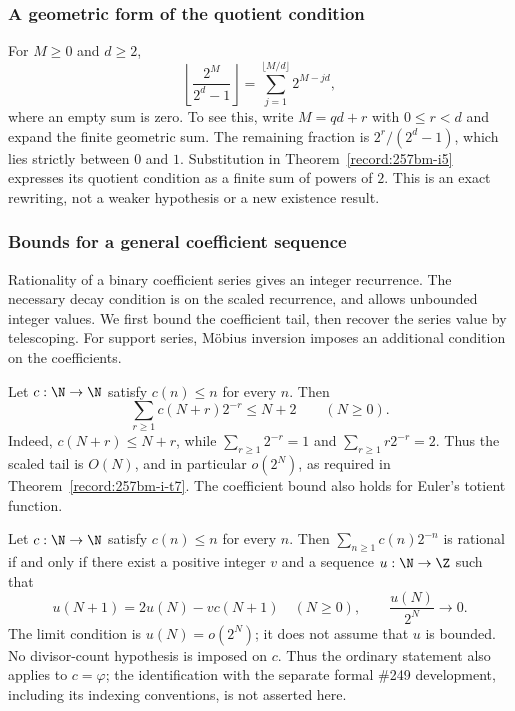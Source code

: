 \subsubsection*{A geometric form of the quotient condition}

\begin{thm}\label{record:257bm-i12}
For $M\ge0$ and $d\ge2$,
\[
 \left\lfloor\frac{2^M}{2^d-1}\right\rfloor
   =\sum_{j=1}^{\lfloor M/d\rfloor}2^{M-jd},
\]
where an empty sum is zero. To see this, write $M=qd+r$ with
$0\le r<d$ and expand the finite geometric sum. The remaining fraction
is $2^r/(2^d-1)$, which lies strictly between $0$ and $1$.
Substitution in Theorem~\ref{record:257bm-i5} expresses its quotient
condition as a finite sum of powers of $2$. This is an exact rewriting,
not a weaker hypothesis or a new existence result.
\end{thm}

\subsubsection*{Bounds for a general coefficient sequence}
Rationality of a binary coefficient series gives an integer recurrence.
The necessary decay condition is on the scaled recurrence, and allows
unbounded integer values. We first bound the coefficient tail, then
recover the series value by telescoping. For support series, M\"obius
inversion imposes an additional condition on the coefficients.


\begin{thm}\label{record:257bm-i2}
Let $c:\N\to\N$ satisfy $c(n)\le n$ for every $n$.  Then
\[
 \sum_{r\ge1}c(N+r)2^{-r}\le N+2\qquad(N\ge0).
\]
Indeed, $c(N+r)\le N+r$, while $\sum_{r\ge1}2^{-r}=1$ and
$\sum_{r\ge1}r2^{-r}=2$.  Thus the scaled tail is $O(N)$, and in
particular $o(2^N)$, as required in Theorem~\ref{record:257bm-i-t7}.
The coefficient bound also holds for Euler's totient function.
\end{thm}

\begin{thm}\label{record:257bm-i-t7}
Let $c:\N\to\N$ satisfy $c(n)\le n$ for every $n$.  Then
$\sum_{n\ge1}c(n)2^{-n}$ is rational if and only if there exist a positive
integer $v$ and a sequence $u:\N\to\Z$ such that
\[
 u(N+1)=2u(N)-v c(N+1)\quad(N\ge0),\qquad
 \frac{u(N)}{2^N}\longrightarrow0.
\]
The limit condition is $u(N)=o(2^N)$; it does not assume that $u$ is bounded.
No divisor-count hypothesis is imposed on $c$.  Thus the ordinary statement
also applies to $c=\varphi$; the identification with the separate formal
\#249 development, including its indexing conventions, is not asserted here.
\end{thm}

